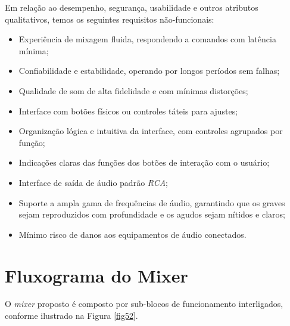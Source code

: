 Em relação ao desempenho, segurança, usabilidade e outros atributos qualitativos, temos os seguintes requisitos não-funcionais:

\begin{itemize}
    \item %
    Experiência de mixagem fluida, respondendo a comandos com latência mínima;
    \item Confiabilidade e estabilidade, operando por longos períodos sem falhas;
    \item %
    Qualidade de som de alta fidelidade e com mínimas distorções; %
    \item Interface com botões físicos ou controles táteis para ajustes; %
    \item Organização lógica e intuitiva da interface, %
    com controles agrupados por função; %
    \item %
    Indicações claras das funções dos botões de interação com o usuário;
    \item %
    Interface de saída de áudio padrão \textit{RCA};
    \item %
    Suporte a ampla gama de frequências de áudio, garantindo que os graves sejam reproduzidos com profundidade e os agudos sejam nítidos e claros;
    \item %
    Mínimo risco de danos aos equipamentos de áudio conectados.
\end{itemize}



\section{Fluxograma do Mixer}

O \textit{mixer} proposto é composto por sub-blocos de funcionamento interligados, conforme ilustrado na Figura \ref{fig52}.

